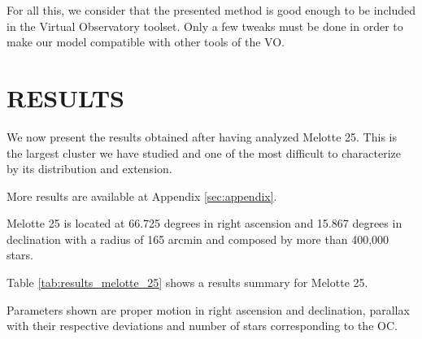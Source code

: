 \documentclass[11pt,a4paper,english,twocolumn]{article}
\begin{document}
For all this, we consider that the presented method is good enough to be included
in the Virtual Observatory toolset. Only a few tweaks must be done in order to make
our model compatible with other tools of the VO.

\section{RESULTS}
\label{sec:results}

We now present the results obtained after having analyzed Melotte 25.
This is the largest cluster we have studied and one of the most difficult
to characterize by its distribution and extension.

More results are available at Appendix \ref{sec:appendix}.

Melotte 25 is located at 66.725 degrees in right ascension and 15.867 degrees in
declination with a radius of 165 arcmin and composed by more than 400,000 stars.

Table \ref{tab:results_melotte_25} shows a results summary for Melotte 25.

\begin{table}[htbp]
  \begin{center}
    \caption{Melotte 25 results.}
    \label{tab:results_melotte_25}
  \end{center}
\end{table}

Parameters shown are proper motion in right ascension and declination, parallax
with their respective deviations and number of stars corresponding to the OC.
\end{document}
